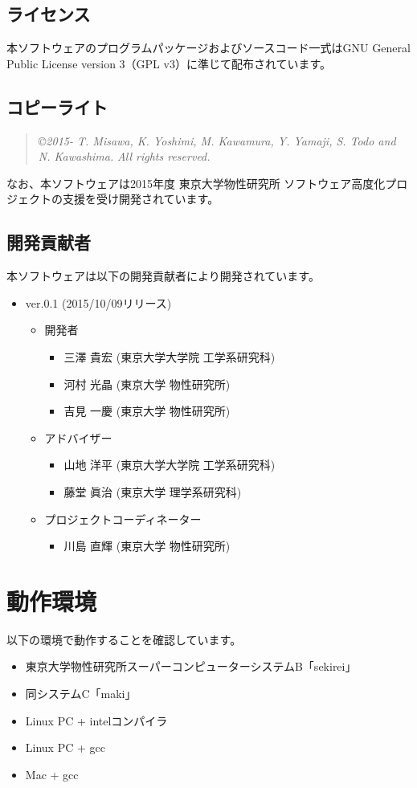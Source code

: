 \subsection{ライセンス}
本ソフトウェアのプログラムパッケージおよびソースコード一式はGNU General Public License version 3（GPL v3）に準じて配布されています。

\subsection{コピーライト}
%
\begin{quote}
{\it \copyright 2015- T. Misawa, K. Yoshimi, M. Kawamura, Y. Yamaji, S. Todo and N. Kawashima.} {\it  All rights reserved.}\\
\end{quote}
なお、本ソフトウェアは2015年度 東京大学物性研究所 ソフトウェア高度化プロジェクトの支援を受け開発されています。

\subsection{開発貢献者}
\label{subsec:developers}
本ソフトウェアは以下の開発貢献者により開発されています。
\begin{itemize}
\item{ver.0.1 (2015/10/09リリース)}
\begin{itemize}
\item{開発者}
	\begin{itemize}
	\item{三澤 貴宏 (東京大学大学院 工学系研究科)}
	\item{河村 光晶 (東京大学 物性研究所)}
	\item{吉見 一慶 (東京大学 物性研究所)}
	\end{itemize}
\item{アドバイザー}
	\begin{itemize}
	\item{山地 洋平 (東京大学大学院 工学系研究科)}
	\item{藤堂 眞治 (東京大学 理学系研究科)}
	\end{itemize}
\item{プロジェクトコーディネーター}
	\begin{itemize}
	\item{川島 直輝 (東京大学 物性研究所)}
	\end{itemize}

\end{itemize}
\end{itemize}


\section{動作環境}
 以下の環境で動作することを確認しています。

\begin{itemize}
\item 東京大学物性研究所スーパーコンピューターシステムB「sekirei」
\item 同システムC「maki」
\item Linux PC + intelコンパイラ
\item Linux PC + gcc
\item Mac + gcc
\end{itemize}
